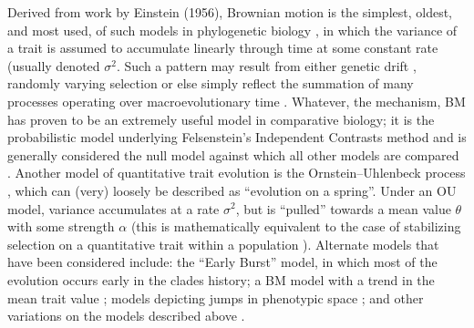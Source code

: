 \documentclass[12pt]{article}
\begin{document}
Derived from work by Einstein (1956), Brownian motion is the simplest, oldest, and most used, of such models in phylogenetic biology  \citep[BM;][]{Edwards1964, Felsenstein1971, Thompson1975}, in which the variance of a trait is assumed to accumulate linearly through time at some constant rate (usually denoted $\sigma^2$. Such a pattern may result from either genetic drift \citep{Lande1976, Hansen1996}, randomly varying selection \citep{Felsenstein1973, Felsenstein1988} or else simply reflect the summation of many processes operating over macroevolutionary time \citep{Hansen1996, Uyeda2011, PennellHarmon, PennellPE}. Whatever, the mechanism, BM has proven to be an extremely useful model in comparative biology; it is the probabilistic model underlying Felsenstein's Independent Contrasts method \citep[][see below]{Felsenstein1985} and is generally considered the null model against which all other models are compared \citep{Blomberg2003}. %
Another model of quantitative trait evolution is the Ornstein--Uhlenbeck process \citep[OU;][]{Felsenstein1988, Hansen1997}, which can (very) loosely be described as ``evolution on a spring''. Under an OU model, variance accumulates at a rate $\sigma^2$, but is ``pulled'' towards a mean value $\theta$ with some strength $\alpha$ (this is mathematically equivalent to the case of stabilizing selection on a quantitative trait within a population \citep{Lande1976}). %
Alternate models that have been considered include: the ``Early Burst'' \citep[EB;][]{Blomberg2003, Harmon2010, SlaterPennell} model, in which most of the evolution occurs early in the clades history; a BM model with a trend in the mean trait value \citep{Hunt2006}; models depicting jumps in phenotypic space \citep{Landis2012, Eastmanlevy}; and other variations on the models described above \citep[e.g.][]{Pagel1997, Pagel1999, ButlerKing2004, Omeara2006, Eastman2011, Beaulieu2012, SlaterMEE}. 
\end{document}
